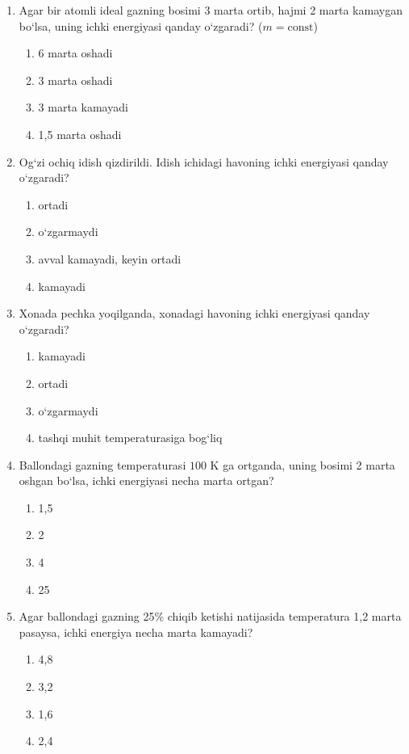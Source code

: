 \begin{enumerate}
\begin{enumerate}[label=\Alph*)]
\end{enumerate}

\item Agar bir atomli ideal gazning bosimi 3 marta ortib, hajmi 2 marta kamaygan bo‘lsa, uning ichki energiyasi qanday o‘zgaradi? ($m=\text{const}$)
\begin{enumerate}[label=\Alph*)]
\item 6 marta oshadi
\item 3 marta oshadi
\item 3 marta kamayadi
\item 1,5 marta oshadi

\end{enumerate}

\item Og‘zi ochiq idish qizdirildi. Idish ichidagi havoning ichki energiyasi qanday o‘zgaradi?
\begin{enumerate}[label=\Alph*)]
\item ortadi
\item o‘zgarmaydi
\item avval kamayadi, keyin ortadi
\item kamayadi

\end{enumerate}

\item Xonada pechka yoqilganda, xonadagi havoning ichki energiyasi qanday o‘zgaradi?
\begin{enumerate}[label=\Alph*)]
\item kamayadi
\item ortadi
\item o‘zgarmaydi
\item tashqi muhit temperaturasiga bog‘liq
\end{enumerate}

\item Ballondagi gazning temperaturasi $100$ K ga ortganda, uning bosimi 2 marta oshgan bo‘lsa, ichki energiyasi necha marta ortgan?
\begin{enumerate}[label=\Alph*)]
\item 1,5
\item 2
\item 4
\item 25

\end{enumerate}

\item Agar ballondagi gazning 25\% chiqib ketishi natijasida temperatura 1,2 marta pasaysa, ichki energiya necha marta kamayadi?
\begin{enumerate}[label=\Alph*)]
\item 4,8
\item 3,2
\item 1,6
\item 2,4


\end{enumerate}
\end{enumerate}
